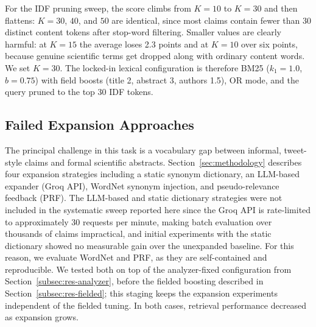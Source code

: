 For the IDF pruning sweep, the score climbs from $K{=}10$ to $K{=}30$ and then flattens: $K{=}30$, $40$, and $50$ are identical, since most claims contain fewer than 30 distinct content tokens after stop-word filtering. Smaller values are clearly harmful: at $K{=}15$ the average loses 2.3 points and at $K{=}10$ over six points, because genuine scientific terms get dropped along with ordinary content words. We set $K{=}30$. The locked-in lexical configuration is therefore BM25 ($k_1{=}1.0$, $b{=}0.75$) with field boosts (title 2, abstract 3, authors 1.5), OR mode, and the query pruned to the top 30 IDF tokens.

\newpage
\subsection{Failed Expansion Approaches}
\label{subsec:res-expansion}

The principal challenge in this task is a vocabulary gap between informal, tweet-style claims and formal scientific abstracts. Section~\ref{sec:methodology} describes four expansion strategies including a static synonym dictionary, an LLM-based expander (Groq API), WordNet synonym injection, and pseudo-relevance feedback (PRF). The LLM-based and static dictionary strategies were not included in the systematic sweep reported here since the Groq API is rate-limited to approximately 30 requests per minute, making batch evaluation over thousands of claims impractical, and initial experiments with the static dictionary showed no measurable gain over the unexpanded baseline. For this reason, we evaluate WordNet and PRF, as they are self-contained and reproducible. We tested both on top of the analyzer-fixed configuration from Section~\ref{subsec:res-analyzer}, before the fielded boosting described in Section~\ref{subsec:res-fielded}; this staging keeps the expansion experiments independent of the fielded tuning. In both cases, retrieval performance decreased as expansion grows.

